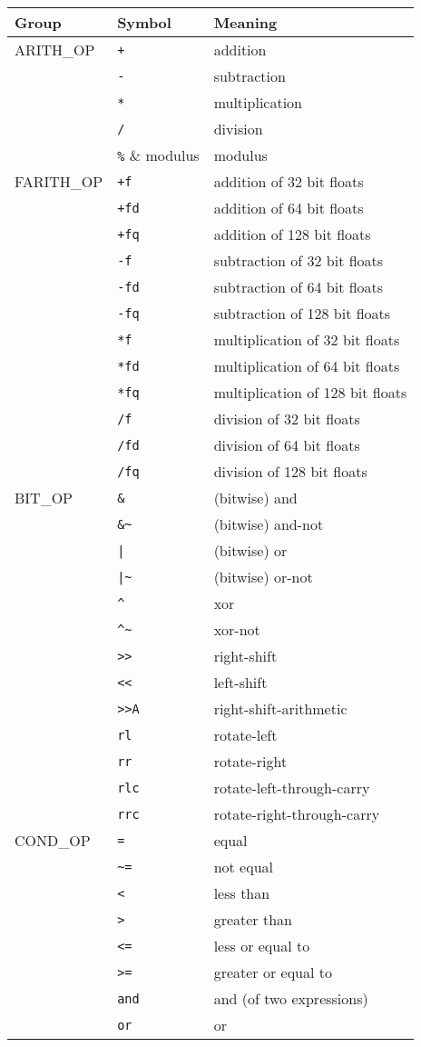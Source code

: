\centerfigbegin
\begin{tabular}{|l|l|l|} \hline
Group		& Symbol			& Meaning \\ \hline
ARITH\_OP	& \texttt{+}		& addition \\
			& \texttt{-}		& subtraction \\
			& \texttt{*}		& multiplication \\
			& \texttt{/}		& division \\
			& \verb!%!			& modulus \\ \hline
FARITH\_OP	& \texttt{+f}		& addition of 32 bit floats \\
			& \texttt{+fd}		& addition of 64 bit floats  \\
			& \texttt{+fq}		& addition of 128 bit floats \\
			& \texttt{-f}		& subtraction of 32 bit floats\\
			& \texttt{-fd}		& subtraction of 64 bit floats\\
			& \texttt{-fq}		& subtraction of 128 bit floats\\
			& \texttt{*f}		& multiplication of 32 bit floats\\
			& \texttt{*fd}		& multiplication of 64 bit floats\\
			& \texttt{*fq}		& multiplication of 128 bit floats\\
			& \texttt{/f}		& division of 32 bit floats\\
			& \texttt{/fd}		& division of 64 bit floats\\
			& \texttt{/fq}		& division of 128 bit floats\\ \hline
BIT\_OP		& \verb!&!  		& (bitwise) and \\
			& \verb!&~!  		& (bitwise) and-not \\
			& \verb!|!			& (bitwise) or \\
			& \verb!|~!			& (bitwise) or-not \\
			& \verb!^! 			& xor \\
			& \verb!^~! 		& xor-not \\
			& \verb!>>!   		& right-shift \\
			& \verb!<<!   		& left-shift \\ 
			& \verb!>>A!		& right-shift-arithmetic \\
			& \texttt{rl}		& rotate-left \\
			& \texttt{rr}		& rotate-right \\
			& \texttt{rlc}		& rotate-left-through-carry \\
			& \texttt{rrc}		& rotate-right-through-carry \\ \hline
COND\_OP	& \texttt{=}		& equal \\
			& \verb!~=! & not equal \\
			& \texttt{<}	    & less than \\
			& \texttt{>}	    & greater than \\
			& \texttt{<=}	   	& less or equal to \\
			& \texttt{>=}		& greater or equal to \\
			& \texttt{and}		& and (of two expressions) \\
			& \texttt{or}		& or \\ \hline
\end{tabular}
